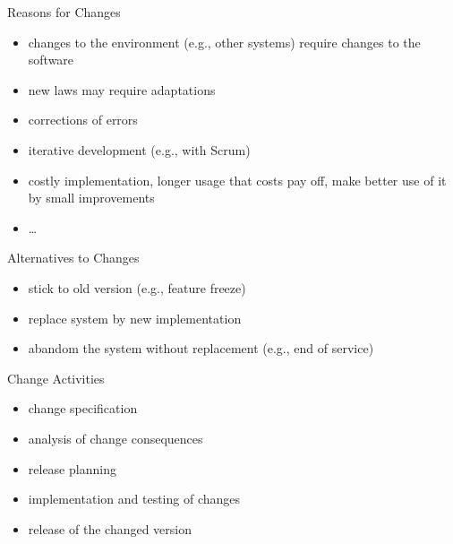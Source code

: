 \begin{frame}{\insertsubsection}
	\begin{fancycolumns}
		\begin{definition}{Reasons for Changes \mysource{\sommerville}}
			\begin{itemize}
				\item changes to the environment (e.g., other systems) require changes to the software
				\item new laws may require adaptations
				\item corrections of errors
				\item iterative development (e.g., with Scrum)
				\item costly implementation, longer usage that costs pay off, make better use of it by small improvements
				\item \ldots
			\end{itemize}
		\end{definition}
	\nextcolumn
		\begin{note}{Alternatives to Changes}
			\begin{itemize}
				\item stick to old version (e.g., feature freeze)
				\item replace system by new implementation
				\item abandom the system without replacement (e.g., end of service)
			\end{itemize}
		\end{note}
		\begin{definition}{Change Activities \mysource{\sommerville}}
			\begin{itemize}
				\item change specification
				\item analysis of change consequences
				\item release planning
				\item implementation and testing of changes
				\item release of the changed version
			\end{itemize}
		\end{definition}
	\end{fancycolumns}
\end{frame}


